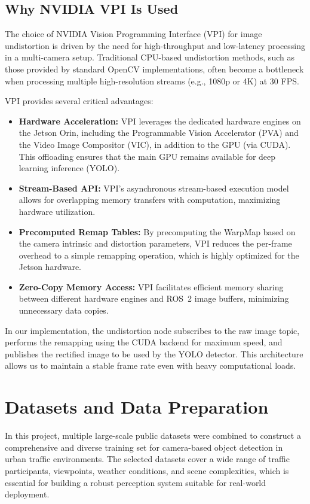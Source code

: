 \documentclass[12pt,a4paper]{report}
\begin{document}
\subsection{Why NVIDIA VPI Is Used}
The choice of NVIDIA Vision Programming Interface (VPI) for image undistortion is driven by the need for high-throughput and low-latency processing in a multi-camera setup. Traditional CPU-based undistortion methods, such as those provided by standard OpenCV implementations, often become a bottleneck when processing multiple high-resolution streams (e.g., 1080p or 4K) at 30 FPS. 

VPI provides several critical advantages:
\begin{itemize}
    \item \textbf{Hardware Acceleration:} VPI leverages the dedicated hardware engines on the Jetson Orin, including the Programmable Vision Accelerator (PVA) and the Video Image Compositor (VIC), in addition to the GPU (via CUDA). This offloading ensures that the main GPU remains available for deep learning inference (YOLO).
    \item \textbf{Stream-Based API:} VPI's asynchronous stream-based execution model allows for overlapping memory transfers with computation, maximizing hardware utilization.
    \item \textbf{Precomputed Remap Tables:} By precomputing the WarpMap based on the camera intrinsic and distortion parameters, VPI reduces the per-frame overhead to a simple remapping operation, which is highly optimized for the Jetson hardware.
    \item \textbf{Zero-Copy Memory Access:} VPI facilitates efficient memory sharing between different hardware engines and ROS~2 image buffers, minimizing unnecessary data copies.
\end{itemize}

In our implementation, the undistortion node subscribes to the raw image topic, performs the remapping using the CUDA backend for maximum speed, and publishes the rectified image to be used by the YOLO detector. This architecture allows us to maintain a stable frame rate even with heavy computational loads.

\section{Datasets and Data Preparation}
In this project, multiple large-scale public datasets were combined to construct a comprehensive and diverse training set for camera-based object detection in urban traffic environments. The selected datasets cover a wide range of traffic participants, viewpoints, weather conditions, and scene complexities, which is essential for building a robust perception system suitable for real-world deployment.
\end{document}
